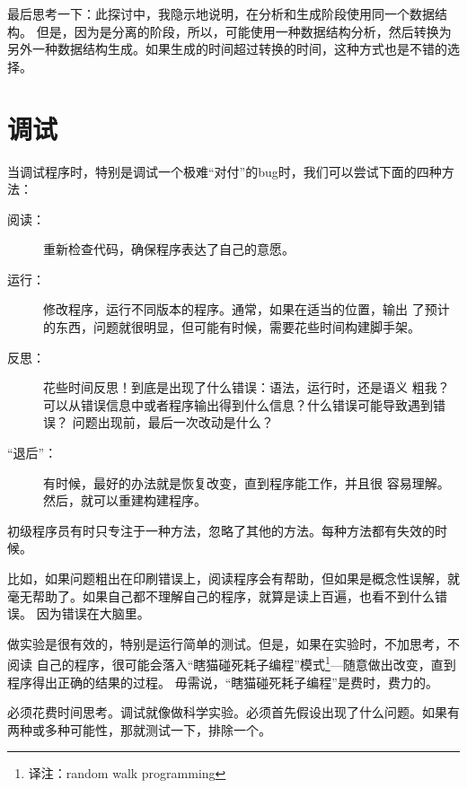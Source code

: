 最后思考一下：此探讨中，我隐示地说明，在分析和生成阶段使用同一个数据结构。
但是，因为是分离的阶段，所以，可能使用一种数据结构分析，然后转换为另外一种数据结构生成。如果生成的时间超过转换的时间，这种方式也是不错的选择。



\section{调试}

当调试程序时，特别是调试一个极难“对付”的bug时，我们可以尝试下面的四种方法：

\begin{description}

\item [阅读：]重新检查代码，确保程序表达了自己的意愿。

\item [运行：]修改程序，运行不同版本的程序。通常，如果在适当的位置，输出
了预计的东西，问题就很明显，但可能有时候，需要花些时间构建脚手架。

\item [反思：]花些时间反思！到底是出现了什么错误：语法，运行时，还是语义
粗我？可以从错误信息中或者程序输出得到什么信息？什么错误可能导致遇到错误？
问题出现前，最后一次改动是什么？

\item [“退后”：]有时候，最好的办法就是恢复改变，直到程序能工作，并且很
容易理解。然后，就可以重建构建程序。

\end{description}

初级程序员有时只专注于一种方法，忽略了其他的方法。每种方法都有失效的时候。


比如，如果问题粗出在印刷错误上，阅读程序会有帮助，但如果是概念性误解，就
毫无帮助了。如果自己都不理解自己的程序，就算是读上百遍，也看不到什么错误。
因为错误在大脑里。


做实验是很有效的，特别是运行简单的测试。但是，如果在实验时，不加思考，不阅读
自己的程序，很可能会落入“瞎猫碰死耗子编程”模式\footnote{译注：random walk 
	programming}---随意做出改变，直到程序得出正确的结果的过程。
	毋需说，“瞎猫碰死耗子编程”是费时，费力的。


必须花费时间思考。调试就像做科学实验。必须首先假设出现了什么问题。如果有
两种或多种可能性，那就测试一下，排除一个。


